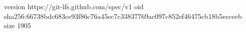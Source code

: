version https://git-lfs.github.com/spec/v1
oid sha256:66738bdc683ce93f86c76a45ec7c33837769ac097c852ef46475cb18b5ecceeb
size 1905
